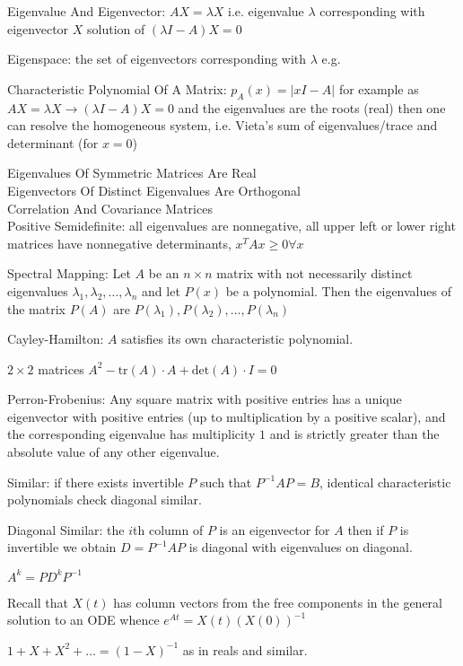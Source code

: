 Eigenvalue And Eigenvector: $AX=\lambda X$ i.e. eigenvalue $\lambda$ corresponding with eigenvector $X$ solution of $(\lambda I-A)X=0$

Eigenspace: the set of eigenvectors corresponding with $\lambda$ e.g.

Characteristic Polynomial Of A Matrix: $p_A (x)=|xI - A|$ for example as $AX=\lambda X \to (\lambda I - A)X=0$ and the eigenvalues are the roots (real) then one can resolve the homogeneous system, i.e. Vieta's sum of eigenvalues/trace and determinant (for $x=0$)

Eigenvalues Of Symmetric Matrices Are Real \\
Eigenvectors Of Distinct Eigenvalues Are Orthogonal \\
Correlation And Covariance Matrices \\

Positive Semidefinite: all eigenvalues are nonnegative, all upper left or lower right matrices have nonnegative determinants, $x^TAx\ge 0 \forall x$

Spectral Mapping: Let $A$ be an $n \times n$ matrix with not necessarily distinct eigenvalues $\lambda_1, \lambda_2, \dots, \lambda_n$ and let $P(x)$ be a polynomial. Then the eigenvalues of the matrix $P(A)$ are $P(\lambda_1), P(\lambda_2), \dots, P(\lambda_n)$

Cayley-Hamilton: $A$ satisfies its own characteristic polynomial.

$2 \times 2$ matrices $A^2-\text{tr}(A) \cdot A+\text{det}(A) \cdot I = 0$

Perron-Frobenius: Any square matrix with positive entries has a unique eigenvector with positive entries (up to multiplication by a positive scalar), and the corresponding eigenvalue has multiplicity $1$ and is strictly greater than the absolute value of any other eigenvalue.

Similar: if there exists invertible $P$ such that $P^{-1} A P=B$, identical characteristic polynomials check diagonal similar.

Diagonal Similar: the $i$th column of $P$ is an eigenvector for $A$ then if $P$ is invertible we obtain $D=P^{-1} A P$ is diagonal with eigenvalues on diagonal.

$A^k=P D^k P^{-1}$

Recall that $X(t)$ has column vectors from the free components in the general solution to an ODE whence $e^{At}=X(t)(X(0))^{-1}$

$1+X+X^2+\dots =(1-X)^{-1}$ as in reals and similar.

